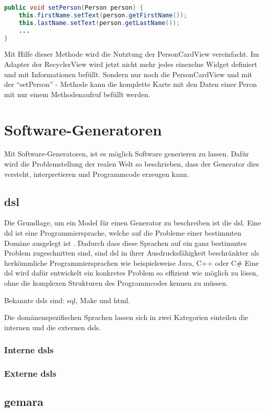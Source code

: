 \begin{lstlisting}[label=lst:setPerson,
language=java,
firstnumber=1,
caption=\enquote{setPerson} - Methode aus der PersonCardView]				   
public void setPerson(Person person) {
	this.firstName.setText(person.getFirstName());
	this.lastName.setText(person.getLastName());	
	...
}
\end{lstlisting}

Mit Hilfe dieser Methode wird die Nutztung der PersonCardView vereinfacht. Im Adapter der RecyclerView wird jetzt nicht mehr jedes einezelne Widget definiert und mit Informationen befüllt. Sondern nur noch die PersonCardView und mit der \enquote{setPerson} - Methode kann die komplette Karte mit den Daten einer Peron mit nur einem Methodenaufruf befüllt werden.

\section{Software-Generatoren}\label{sec:generators}

Mit Software-Generatoren, ist es möglich Software generieren zu lassen. Dafür wird die Problemstellung der realen Welt so beschrieben, dass der Generator dies versteht, interpretieren und Programmcode erzeugen kann.

\subsection{\acf{dsl}}\label{sec:dsl}
Die Grundlage, um ein Model für einen Generator zu beschreiben ist die \acl{dsl}.
Eine \acs{dsl} ist eine Programmiersprache, welche auf die Probleme einer bestimmten Domäne ausgelegt ist \cite{dslHudak}. Dadurch dass diese Sprachen auf ein ganz bestimmtes Problem zugeschnitten sind, sind \acl{dsl} in ihrer Ausdrucksfähigkeit beschränkter als herkömmliche Programmiersprachen wie beispielsweise Java, C++ oder C\# Eine \acl{dsl} wird dafür entwickelt ein konkretes Problem so effizient wie möglich zu lösen, ohne die komplexen Strukturen des Programmcodes kennen zu müssen.

Bekannte \aclp{dsl} sind: \ac{sql}, Make und \acf{html}.

Die domänenspezifischen Sprachen lassen sich in zwei Kategorien einteilen die internen und die externen \acsp{dsl}.

\subsubsection{Interne \acsp{dsl}} \label{sec:intern}


\subsubsection{Externe \acsp{dsl}} \label{sec:extern}

\subsection{\acf{gemara}}\label{sec:gemara}